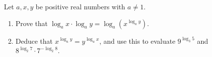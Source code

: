 Let $a,x,y$ be positive real numbers with $a\ne1$.
\begin{enumerate}
\item[(a)] Prove that $\log_a x\cdot\log_a y=\log_a\!\left(x^{\log_a y}\right)$.
\item[(b)] Deduce that $x^{\log_a y}=y^{\log_a x}$, and use this to evaluate $9^{\log_3 5}$ and $8^{\log_2 7}\cdot 7^{-\log_2 8}$.
\end{enumerate}
